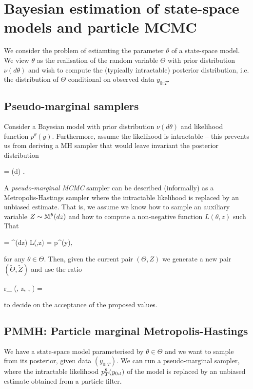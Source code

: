 \section{Bayesian estimation of state-space models and particle MCMC}

We consider the problem of estiamting the parameter $\theta$ of a state-space model. We view $\theta$ as the realisation of the random variable $\Theta$ with prior distribution $\nu(d\theta)$ and wish to compute the (typically intractable) posterior distribution, i.e. the distribution of $\Theta$ conditional on observed data $y_{0:T}$.

\subsection{Pseudo-marginal samplers}

Consider a Bayesian model with prior distribution $\nu(d\theta)$ and likelihood function $p^\theta(y)$. Furthermore, assume the likelihood is intractable -- this prevents us from deriving a MH sampler that would leave invariant the posterior distribution

\beq
  \PP{} = \nu (d\theta) .
\eeq

A \textit{pseudo-marginal MCMC} sampler can be described (informally) as a Metropolis-Hastings sampler where the intractable likelihood is replaced by an unbiased estimate. That is, we assume we know how to sample an auxiliary variable $Z \sim \mathbb{M}^\theta(dz)$ and how to compute a non-negative function $L(\theta, z)$ such That

\beq
   = \int \M^\theta (dz) L(\theta,z) = p^\theta (y),
\eeq

for any $\theta \in \Theta$. Then, given the current pair $(\Theta, Z)$ we generate a new pair $(\tilde{\Theta}, \tilde{Z})$ and use the ratio

\beq
  r_{} (\theta, z, \tilde\theta, ) = 
\eeq

to decide on the acceptance of the proposed values.

\subsection{PMMH: Particle marginal Metropolis-Hastings}

We have a state-space model parameterised by $\theta \in \Theta$ and we want to sample from its posterior, given data $(y_{0:T})$. We can run a pseudo-marginal sampler, where the intractable likelihood $p_{T}^\theta (y_{0:t})$ of the model is replaced by an unbiased estimate obtained from a particle filter.

